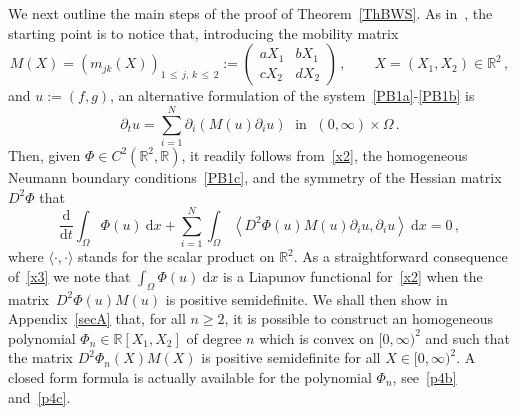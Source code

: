 \documentclass[10pt]{amsart}
\theoremstyle{definition}\newtheorem{defi}[theo]{Definition}\newtheorem{rema}[theo]{Remark}\newtheorem{exam}[theo]{Example}\newtheorem{exem}[theo]{Example}\newtheorem{nota}[theo]{Notation}
\newcommand{\bbR}{\mathbb{R}}
\newcommand{\rmd}{\mathrm{d}}
\begin{document}
We next outline the main steps of the proof of Theorem~\ref{ThBWS}. As in~\cite{LM22}, the starting point is to notice that, introducing the mobility matrix
\begin{equation}\label{x1}
M(X) = \left(m_{jk}(X)\right)_{1\,\le\,j,\,k\,\le \,2} :=
\begin{pmatrix}
a X_1& b X_1 \\
c X_2 & d X_2
\end{pmatrix}\,, \qquad X=(X_1,X_2)\in \bbR^2\,, 
\end{equation}
and $u:=(f,g)$, an alternative formulation of the system~\eqref{PB1a}-\eqref{PB1b} is
\begin{equation}\label{x2}
\partial_t u = \sum_{i=1}^N\partial_i (M(u)\partial_i u) \;\text{ in }\; (0,\infty)\times \Omega\,. 
\end{equation}
Then, given $\Phi\in C^2(\bbR^2,\bbR)$, it readily follows from~\eqref{x2}, the homogeneous Neumann boundary conditions~\eqref{PB1c}, and the symmetry of the Hessian matrix $D^2\Phi$ that
\begin{equation}\label{x3}
\frac{\rmd }{\rmd t} \int_\Omega \Phi(u)\ \rmd x + \sum_{i=1}^N\int_\Omega \left\langle D^2\Phi(u) M(u) \partial_i u, \partial_i u \right\rangle\ \rmd x = 0\,, 
\end{equation}
where $\langle \cdot,\cdot \rangle$ stands for the scalar product on $\bbR^2$. As a straightforward consequence of~\eqref{x3} we note that $\int_\Omega \Phi(u)\ \rmd x$ is a Liapunov functional for~\eqref{x2} when the matrix~${D^2\Phi(u) M(u)}$ is positive semidefinite. We shall then show in Appendix~\ref{secA} that, for all $n\ge 2$, it is possible to construct an homogeneous polynomial $\Phi_n\in \bbR[X_1,X_2]$ of degree $n$ which is convex on $[0,\infty)^2$ and such that the matrix $D^2\Phi_n(X) M(X)$ is positive semidefinite for all $X\in [0,\infty)^2$. A closed form formula is actually available for the polynomial $\Phi_n$, see~\eqref{p4b} and~\eqref{p4c}.
\end{document}
